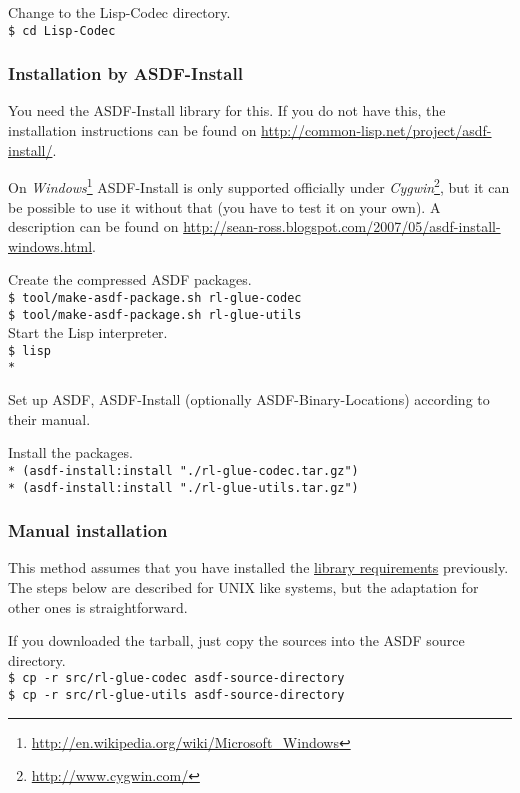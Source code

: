 \documentclass[11pt,a4paper,dvipdfm]{article}
\newcommand{\selfref}[1]{\href{#1}{#1}}
\newcommand{\footref}[2]{\textsl{#1}\footnote{\selfref{#2}}}
\newcommand{\prompttext}[1]{\texttt{#1}}
\newcommand{\shprompt}[1]{\prompttext{\$ #1}}
\newcommand{\lispprompt}[1]{\prompttext{* #1}}
\begin{document}
Change to the Lisp-Codec directory. \\
\shprompt{cd Lisp-Codec}

\hypertarget{asdfinst}{\subsubsection{Installation by ASDF-Install}}

You need the ASDF-Install library for this. If you do not have this, the
installation instructions can be found on
\selfref{http://common-lisp.net/project/asdf-install/}.

On \footref{Windows}{http://en.wikipedia.org/wiki/Microsoft\_Windows}
ASDF-Install is only supported officially under
\footref{Cygwin}{http://www.cygwin.com/}, but it can be possible to use it
without that (you have to test it on your own). A description can be found on
\selfref{http://sean-ross.blogspot.com/2007/05/asdf-install-windows.html}.

Create the compressed ASDF packages. \\
\shprompt{tool/make-asdf-package.sh rl-glue-codec} \\
\shprompt{tool/make-asdf-package.sh rl-glue-utils} \\

Start the Lisp interpreter. \\
\shprompt{lisp} \\
\lispprompt{}

Set up ASDF, ASDF-Install (optionally ASDF-Binary-Locations) according to
their manual.

Install the packages. \\
\lispprompt{(asdf-install:install "./rl-glue-codec.tar.gz")} \\
\lispprompt{(asdf-install:install "./rl-glue-utils.tar.gz")}

\subsubsection{Manual installation}

This method assumes that you have installed the
\hyperlink{softreqs}{library requirements} previously. The steps below are
described for UNIX like systems, but the adaptation for other ones is
straightforward.

If you downloaded the tarball, just copy the sources into the ASDF source
directory. \\
\shprompt{cp -r src/rl-glue-codec asdf-source-directory} \\
\shprompt{cp -r src/rl-glue-utils asdf-source-directory}
\end{document}
